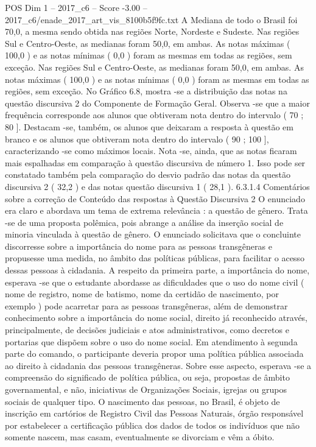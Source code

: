 \begin{textsample}{POS Dim 1 – 2017\_c6 – Score -3.00 – 2017\_c6/enade\_2017\_art\_vis\_8100b5f9fc.txt}
A Mediana de todo o Brasil foi 70,0, a mesma sendo obtida nas regiões Norte, Nordeste e Sudeste.
Nas regiões Sul e Centro-Oeste, as medianas foram 50,0, em ambas.
As notas máximas ( 100,0 ) e as notas mínimas ( 0,0 ) foram as mesmas em todas as regiões, sem exceção.
Nas regiões Sul e Centro-Oeste, as medianas foram 50,0, em ambas.
As notas máximas ( 100,0 ) e as notas mínimas ( 0,0 ) foram as mesmas em todas as regiões, sem exceção.
No Gráfico 6.8, mostra -se a distribuição das notas na questão discursiva 2 do Componente de Formação Geral.
Observa -se que a maior frequência corresponde aos alunos que obtiveram nota dentro do intervalo ( 70 ; 80 ].
Destacam -se, também, os alunos que deixaram a resposta à questão em branco e os alunos que obtiveram nota dentro do intervalo ( 90 ; 100 ], caracterizando -se como máximos locais.
Nota -se, ainda, que as notas ficaram mais espalhadas em comparação à questão discursiva de número 1.
Isso pode ser constatado também pela comparação do desvio padrão das notas da questão discursiva 2 ( 32,2 ) e das notas questão discursiva 1 ( 28,1 ). 6.3.1.4 Comentários sobre a correção de Conteúdo das respostas à Questão Discursiva 2 O enunciado era claro e abordava um tema de extrema relevância : a questão de gênero.
Trata -se de uma proposta polêmica, pois abrange a análise da inserção social de minoria vinculada à questão de gênero.
O enunciado solicitava que o concluinte discorresse sobre a importância do nome para as pessoas transgêneras e propusesse uma medida, no âmbito das políticas públicas, para facilitar o acesso dessas pessoas à cidadania.
A respeito da primeira parte, a importância do nome, esperava -se que o estudante abordasse as dificuldades que o uso do nome civil ( nome de registro, nome de batismo, nome da certidão de nascimento, por exemplo ) pode acarretar para as pessoas transgêneras, além de demonstrar conhecimento sobre a importância do nome social, direito já reconhecido através, principalmente, de decisões judiciais e atos administrativos, como decretos e portarias que dispõem sobre o uso do nome social.
Em atendimento à segunda parte do comando, o participante deveria propor uma política pública associada ao direito à cidadania das pessoas transgêneras.
Sobre esse aspecto, esperava -se a compreensão do significado de política pública, ou seja, propostas de âmbito governamental, e não, iniciativas de Organizações Sociais, igrejas ou grupos sociais de qualquer tipo.
O nascimento das pessoas, no Brasil, é objeto de inscrição em cartórios de Registro Civil das Pessoas Naturais, órgão responsável por estabelecer a certificação pública dos dados de todos os indivíduos que não somente nascem, mas casam, eventualmente se divorciam e vêm a óbito.

\end{textsample}
